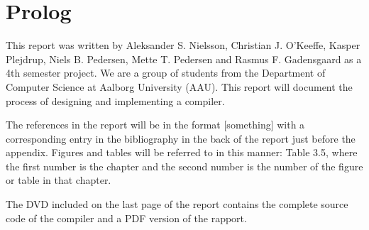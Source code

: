 \section{Prolog}
This report was written by Aleksander S. Nielsson, Christian J. O'Keeffe, Kasper Plejdrup, Niels  B. Pedersen, Mette T. Pedersen and Rasmus F. Gadensgaard as a 4th semester project. We are a group of students from the Department of Computer Science at Aalborg University (AAU). This report will document the process of designing and implementing a compiler.

The references in the report will be in the format [something] with a corresponding entry in the bibliography in the back of the report just before the appendix. Figures and tables will be referred to in this manner: Table 3.5, where the first number is the chapter and the second number is the number of the figure or table in that chapter.

The DVD included on the last page of the report contains the complete source code of the compiler and a PDF version of the rapport.
